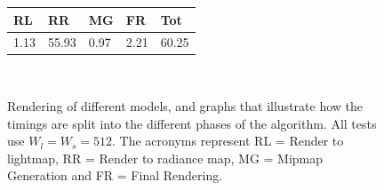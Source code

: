 \begin{figure}
{\begin{tabular}[b]{lllll}
\multicolumn{1}{|l|}{RL}   & \multicolumn{1}{l|}{RR}    & \multicolumn{1}{l|}{MG}   & \multicolumn{1}{l|}{FR}   & \multicolumn{1}{l|}{Tot}   \\ \hline
\multicolumn{1}{|l|}{1.13} & \multicolumn{1}{l|}{55.93} & \multicolumn{1}{l|}{0.97} & \multicolumn{1}{l|}{2.21} & \multicolumn{1}{l|}{60.25} \\ \hline
\end{tabular}
}\\
\caption{Rendering of different models, and graphs that illustrate how the timings are split into the different phases of the algorithm. All tests use $W_l = W_s = 512$. The acronyms represent RL = Render to lightmap, RR = Render to radiance map, MG = Mipmap Generation and FR = Final Rendering.}
\label{fig:timingssplit}
\end{figure}

\FloatBarrier
